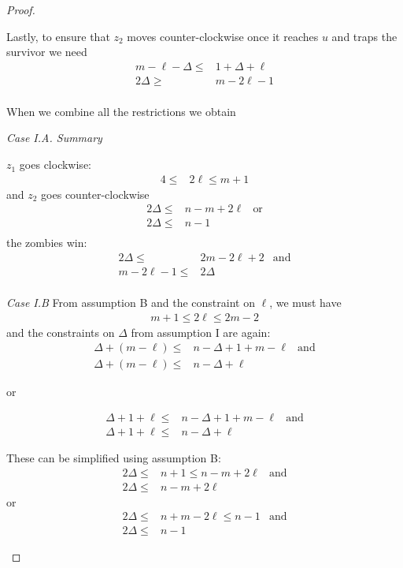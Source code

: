 \documentclass[letterpaper, 10pt]{article}
\begin{document}
\begin{proof}
\begin{proofpart}
  Lastly, to ensure that $z_2$ moves counter-clockwise once
  it reaches $u$ and traps the survivor we need
  \begin{align*}
   m - \ell - \Delta \leq & 1 + \Delta + \ell \\
   2 \Delta \geq          & m - 2\ell  -1     \\
  \end{align*}

  When we combine all the restrictions we obtain

  \textit{Case I.A. Summary}

  $z_1$ goes clockwise:
  \begin{align*}
   4 \leq & 2 \ell \leq m + 1
  \end{align*}
  and $z_2$ goes counter-clockwise
  \begin{align*}
   2 \Delta \leq & n - m + 2\ell & \text{or} \\
   2 \Delta \leq & n - 1                     \\
  \end{align*}
  the zombies win:
  \begin{align*}
   2 \Delta \leq      & 2 m- 2 \ell + 2 & \text{and} \\
   m - 2\ell  -1 \leq & 2 \Delta                     \\
  \end{align*}

  \textit{Case I.B}
  From assumption B and the constraint on $\ell$, we must have
  \begin{align*}
   m + 1 \leq 2 \ell \leq 2m - 2
  \end{align*}
  and the constraints on $\Delta$ from assumption I are again:
  \begin{align*}
   \Delta + (m - \ell) \leq & n - \Delta + 1 + m - \ell & \text{and} \\
   \Delta + (m - \ell) \leq & n - \Delta + \ell
  \end{align*}
  \begin{center}or\end{center}
  \begin{align*}
   \Delta + 1 + \ell \leq & n - \Delta + 1 + m - \ell & \text{and} \\
   \Delta + 1 + \ell \leq & n - \Delta + \ell
  \end{align*}

  These can be simplified using assumption B:
  \begin{align*}
   2 \Delta \leq & n+1 \leq n-m+2\ell & \text{and} \\
   2 \Delta \leq & n - m + 2\ell
  \end{align*}
  or
  \begin{align*}
   2 \Delta \leq & n+m -2 \ell \leq n-1 & \text{and} \\
   2 \Delta \leq & n -1
  \end{align*}


\end{proofpart}
\end{proof}
\end{document}
